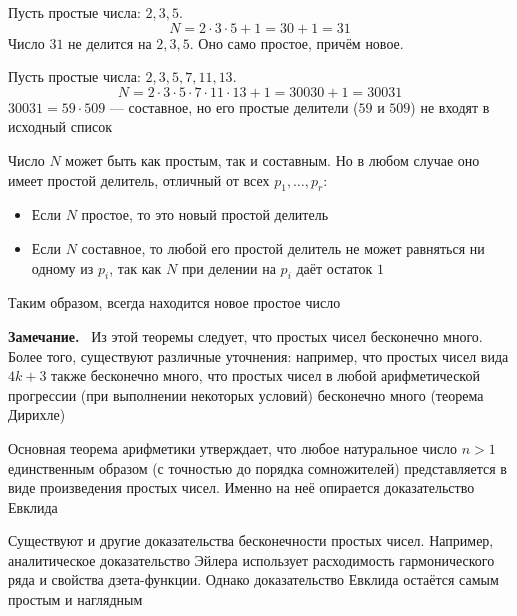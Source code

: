 \documentclass[a4paper,12pt]{article}
\newcommand{\myremark}{\textbf{Замечание.}\ }
\theoremstyle{definition}
\theoremstyle{plain}
\theoremstyle{remark}
\begin{document}
	\begin{tcolorbox}[colback=blue!5, colframe=blue!40!black, title=Иллюстрация]
		Пусть простые числа: $2, 3, 5$.
		\[
		N = 2 \cdot 3 \cdot 5 + 1 = 30 + 1 = 31
		\]
		Число $31$ не делится на $2, 3, 5$. Оно само простое, причём новое.
		
		Пусть простые числа: $2, 3, 5, 7, 11, 13$.
		\[
		N = 2 \cdot 3 \cdot 5 \cdot 7 \cdot 11 \cdot 13 + 1 = 30030 + 1 = 30031
		\]
		$30031 = 59 \cdot 509$ — составное, но его простые делители ($59$ и $509$) не входят в исходный список
	\end{tcolorbox}
	
	\begin{tcolorbox}[colback=green!5, colframe=green!50!black, title=Пояснение]
		Число $N$ может быть как простым, так и составным. Но в любом случае оно имеет простой делитель, отличный от всех $p_1, \dots, p_r$:
		\begin{itemize}
			\item Если $N$ простое, то это новый простой делитель
			\item Если $N$ составное, то любой его простой делитель не может равняться ни одному из $p_i$, так как $N$ при делении на $p_i$ даёт остаток $1$
		\end{itemize}
		Таким образом, всегда находится новое простое число
	\end{tcolorbox}
	
	\myremark
	Из этой теоремы следует, что простых чисел бесконечно много. Более того, существуют различные уточнения: например, что простых чисел вида $4k+3$ также бесконечно много, что простых чисел в любой арифметической прогрессии (при выполнении некоторых условий) бесконечно много (теорема Дирихле)
	
	\begin{tcolorbox}[colback=purple!5, colframe=purple!50!black, title=Заметочка: Основная теорема арифметики]
		Основная теорема арифметики утверждает, что любое натуральное число $n > 1$ единственным образом (с точностью до порядка сомножителей) представляется в виде произведения простых чисел. Именно на неё опирается доказательство Евклида
	\end{tcolorbox}
	
	\begin{tcolorbox}[colback=yellow!5, colframe=orange!60!black, title=Важное замечание]
		Существуют и другие доказательства бесконечности простых чисел. Например, аналитическое доказательство Эйлера использует расходимость гармонического ряда и свойства дзета-функции. Однако доказательство Евклида остаётся самым простым и наглядным
	\end{tcolorbox}
	
\end{document}

